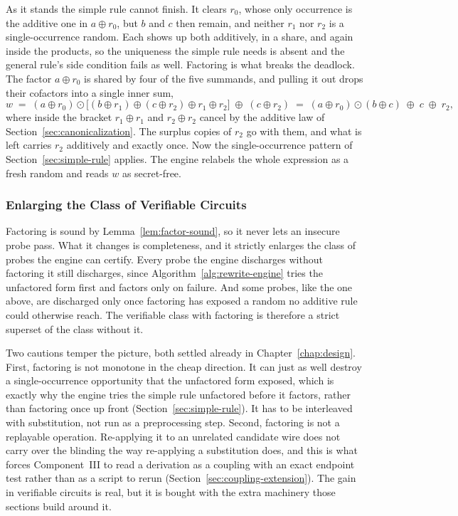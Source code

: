     As it stands the simple rule cannot finish. It clears $r_0$, whose only
    occurrence is the additive one in $a \oplus r_0$, but $b$ and $c$ then remain,
    and neither $r_1$ nor $r_2$ is a single-occurrence random. Each shows up both
    additively, in a share, and again inside the products, so the uniqueness the
    simple rule needs is absent and the general rule's side condition fails as well.
    Factoring is what breaks the deadlock. The factor $a \oplus r_0$ is shared by
    four of the five summands, and pulling it out drops their cofactors into a
    single inner sum,
    \[
      w \;=\; (a \oplus r_0) \odot \big[(b \oplus r_1) \oplus (c \oplus r_2) \oplus r_1 \oplus r_2\big]
          \;\oplus\; (c \oplus r_2)
        \;=\; (a \oplus r_0)\odot(b \oplus c) \;\oplus\; c \;\oplus\; r_2 ,
    \]
    where inside the bracket $r_1 \oplus r_1$ and $r_2 \oplus r_2$ cancel by the
    additive law of Section~\ref{sec:canonicalization}. The surplus copies of
    $r_2$ go with them, and what is left carries $r_2$ additively and exactly once.
    Now the single-occurrence pattern of Section~\ref{sec:simple-rule} applies. The
    engine relabels the whole expression as a fresh random and reads $w$ as
    secret-free.

    \subsubsection{Enlarging the Class of Verifiable Circuits}
    \label{sec:enlarging-verifiable}

    Factoring is sound by Lemma~\ref{lem:factor-sound}, so it never lets an
    insecure probe pass. What it changes is completeness, and it
    strictly enlarges the class of probes the engine can certify. Every probe the
    engine discharges without factoring it still discharges, since
    Algorithm~\ref{alg:rewrite-engine} tries the unfactored form first and factors
    only on failure. And some probes, like the one above, are discharged only once
    factoring has exposed a random no additive rule could otherwise reach. The
    verifiable class with factoring is therefore a strict superset of the class
    without it.

    Two cautions temper the picture, both settled already in
    Chapter~\ref{chap:design}. First, factoring is not monotone in the cheap
    direction. It can just as well destroy a single-occurrence opportunity that the
    unfactored form exposed, which is exactly why the engine tries the simple rule
    unfactored before it factors, rather than factoring once up front
    (Section~\ref{sec:simple-rule}). It has to be interleaved with substitution,
    not run as a preprocessing step. Second, factoring is not a replayable
    operation. Re-applying it to an unrelated candidate wire does not carry over
    the blinding the way re-applying a substitution does, and this is what forces
    Component~III to read a derivation as a coupling with an exact endpoint test
    rather than as a script to rerun (Section~\ref{sec:coupling-extension}). The
    gain in verifiable circuits is real, but it is bought with the extra machinery
    those sections build around it.

